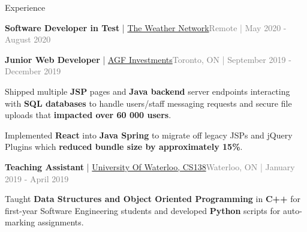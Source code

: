 \documentclass[hidelinks]{resume} %
\begin{document}
\begin{rSection}{Experience}
\begin{rSubsection}{\textbf{Software Developer in Test} | \href{https://www.theweathernetwork.com/}{The Weather Network}}{\textcolor{gray}{Remote | May 2020 - August 2020}}{}
\begin{bulletpoints}
             \vspace{-.25cm}
        \end{bulletpoints}
\end{rSubsection}
\begin{rSubsection}{\textbf{Junior Web Developer} | \href{https://www.agf.com/ca/en/index.jsp}{AGF Investments}}{\textcolor{gray}{Toronto, ON | September 2019 - December 2019}}{}
        \par
        \begin{bulletpoints}
            \vspace{-.10cm}
            \item Shipped multiple \textbf{JSP} pages and \textbf{Java backend} server endpoints interacting with \textbf{SQL databases} to handle users/staff messaging requests and secure file uploads that \textbf{impacted over 60 000 users}.
            \vspace{-.13cm}
             \item Implemented \textbf{React} into \textbf{Java Spring} to migrate off legacy JSPs and jQuery Plugins which \textbf{reduced bundle size by approximately 15\%}.
             \vspace{-.25cm}
        \end{bulletpoints}
\end{rSubsection}
\begin{rSubsection}{\textbf{Teaching Assistant} | \href{https://student.cs.uwaterloo.ca/~cs138/outline.shtml}{University Of Waterloo, CS138}}{\textcolor{gray}{Waterloo, ON | January 2019 - April 2019}}{}

    \begin{bulletpoints}
        \vspace{-.10cm}
        \item Taught \textbf{Data Structures and Object Oriented Programming} in \textbf{C++} for first-year Software Engineering students and developed \textbf{Python} scripts for auto-marking assignments.
        \vspace{-.25cm}
    \end{bulletpoints}   

\end{rSubsection}

\end{rSection}

\vspace{-.05cm}
\end{document}
